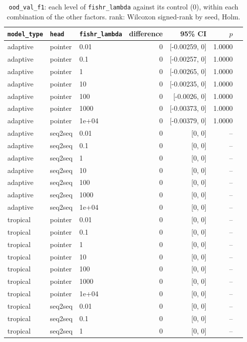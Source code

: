 \documentclass[10pt]{article}
\begin{document}
{\small
\begin{longtable}{lllrrrl}
\caption{\texttt{ood\_val\_f1}: each level of \texttt{fishr\_lambda} against its control (0), within each combination of the other factors. rank: Wilcoxon signed-rank by seed, Holm.}\label{tab:control-ood_val_f1}\\
\toprule
\texttt{model\_type} & \texttt{head} & \texttt{fishr\_lambda} & difference & 95\% CI & $p$ & \\
\midrule
\endhead
adaptive & pointer & 0.01 & 0 & [-0.00259, 0] & 1.0000 & \\
adaptive & pointer & 0.1 & 0 & [-0.00257, 0] & 1.0000 & \\
adaptive & pointer & 1 & 0 & [-0.00265, 0] & 1.0000 & \\
adaptive & pointer & 10 & 0 & [-0.00235, 0] & 1.0000 & \\
adaptive & pointer & 100 & 0 & [-0.0026, 0] & 1.0000 & \\
adaptive & pointer & 1000 & 0 & [-0.00373, 0] & 1.0000 & \\
adaptive & pointer & 1e+04 & 0 & [-0.00379, 0] & 1.0000 & \\
adaptive & seq2seq & 0.01 & 0 & [0, 0] & -- & \\
adaptive & seq2seq & 0.1 & 0 & [0, 0] & -- & \\
adaptive & seq2seq & 1 & 0 & [0, 0] & -- & \\
adaptive & seq2seq & 10 & 0 & [0, 0] & -- & \\
adaptive & seq2seq & 100 & 0 & [0, 0] & -- & \\
adaptive & seq2seq & 1000 & 0 & [0, 0] & -- & \\
adaptive & seq2seq & 1e+04 & 0 & [0, 0] & -- & \\
tropical & pointer & 0.01 & 0 & [0, 0] & -- & \\
tropical & pointer & 0.1 & 0 & [0, 0] & -- & \\
tropical & pointer & 1 & 0 & [0, 0] & -- & \\
tropical & pointer & 10 & 0 & [0, 0] & -- & \\
tropical & pointer & 100 & 0 & [0, 0] & -- & \\
tropical & pointer & 1000 & 0 & [0, 0] & -- & \\
tropical & pointer & 1e+04 & 0 & [0, 0] & -- & \\
tropical & seq2seq & 0.01 & 0 & [0, 0] & -- & \\
tropical & seq2seq & 0.1 & 0 & [0, 0] & -- & \\
tropical & seq2seq & 1 & 0 & [0, 0] & -- & \\

\end{longtable}}
\end{document}
